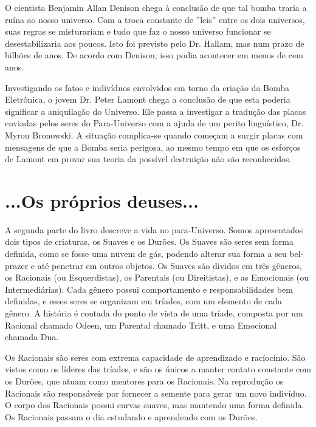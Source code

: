\documentclass[14pt,portuguese]{extreport}
\begin{document}
      O cientista Benjamin Allan Denison chega à conclusão de que tal
      bomba traria a ruína ao nosso universo. Com a troca constante de ”leis”
      entre os dois universos, suas regras se misturariam e tudo que faz o
      nosso universo funcionar se desestabilizaria aos poucos. Isto foi previsto
      pelo Dr. Hallam, mas num prazo de bilhões de anos. De acordo com
      Denison, isso podia acontecer em menos de cem anos.
      
      Investigando os fatos e indivíduos envolvidos em torno da criação da
      Bomba Eletrônica, o jovem Dr. Peter Lamont chega a conclusão de que
      esta poderia significar a aniquilação do Universo. Ele passa a investigar
      a tradução das placas enviadas pelos seres do Para-Universo com a ajuda
      de um perito linguístico, Dr. Myron Bronowski. A situação complica-se
      quando começam a surgir placas com mensagens de que a Bomba seria
      perigosa, ao mesmo tempo em que os esforços de Lamont em provar
      sua teoria da possível destruição não são reconhecidos.

    \section{...Os próprios deuses...}

      A segunda parte do livro descreve a vida no para-Universo. Somos apresentados
      dois tipos de criaturas, os Suaves e os Durões. Os Suaves são seres sem forma definida,
      como se fosse uma nuvem de gás, podendo alterar sua forma a seu bel-prazer e até penetrar em outros objetos. 
      Os Suaves são dividos em três gêneros, os Racionais (ou Esquerdistas), os Parentais (ou Direitistas), 
      e as Emocionais (ou Intermediárias). Cada gênero possui comportamento e responsabilidades
      bem definidas, e esses seres se organizam em tríades, com um elemento de cada gênero. A história
      é contada do ponto de vista de uma tríade, composta por um Racional chamado Odeen, um Parental chamado Tritt,
      e uma Emocional chamada Dua.
      
      Os Racionais são seres com extrema capacidade de aprendizado e racíocinio. São vistos como os líderes das tríades,
      e são os únicos a manter contato constante com os Durões, que atuam como mentores para os Racionais. Na reprodução 
      os Racionais são responsáveis por fornecer a semente para gerar um novo indivíduo. O corpo dos Racionais possui curvas
      suaves, mas mantendo uma forma definida. Os Racionais passam o dia estudando e aprendendo com os Durões.
      
\end{document}
